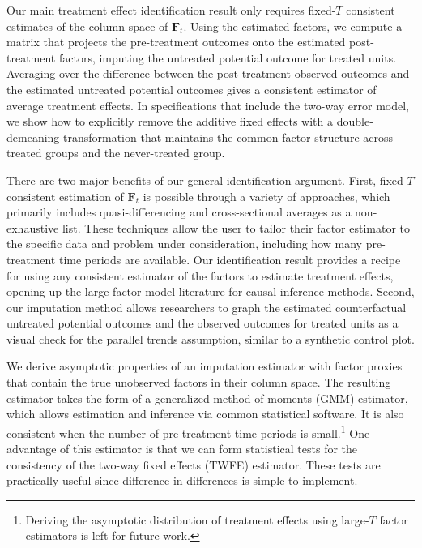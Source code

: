 Our main treatment effect identification result only requires fixed-$T$ consistent estimates of the column space of $\bm{F}_t$. Using the estimated factors, we compute a matrix that projects the pre-treatment outcomes onto the estimated post-treatment factors, imputing the untreated potential outcome for treated units. Averaging over the difference between the post-treatment observed outcomes and the estimated untreated potential outcomes gives a consistent estimator of average treatment effects. In specifications that include the two-way error model, we show how to explicitly remove the additive fixed effects with a double-demeaning transformation that maintains the common factor structure across treated groups and the never-treated group.

There are two major benefits of our general identification argument. First, fixed-$T$ consistent estimation of $\bm{F}_t$ is possible through a variety of approaches, which primarily includes quasi-differencing \citep{Ahn_Lee_Schmidt_2001,Ahn_Lee_Schmidt_2013,Callaway_Karami_2020} and cross-sectional averages \citep{Westerlund_Petrova_Norkute_2019,Juodis_Sarafidis_2022,Juodis_Sarafidis2021,Brown_Schmidt_Wooldridge2021} as a non-exhaustive list. These techniques allow the user to tailor their factor estimator to the specific data and problem under consideration, including how many pre-treatment time periods are available. Our identification result provides a recipe for using any consistent estimator of the factors to estimate treatment effects, opening up the large factor-model literature for causal inference methods. Second, our imputation method allows researchers to graph the estimated counterfactual untreated potential outcomes and the observed outcomes for treated units as a visual check for the parallel trends assumption, similar to a synthetic control plot.

We derive asymptotic properties of an imputation estimator with factor proxies that contain the true unobserved factors in their column space. The resulting estimator takes the form of a generalized method of moments (GMM) estimator, which allows estimation and inference via common statistical software. It is also consistent when the number of pre-treatment time periods is small.\footnote{Deriving the asymptotic distribution of treatment effects using large-$T$ factor estimators is left for future work.} One advantage of this estimator is that we can form statistical tests for the consistency of the two-way fixed effects (TWFE) estimator. These tests are practically useful since difference-in-differences is simple to implement. 

